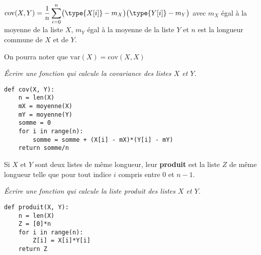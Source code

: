 $\displaystyle \text{cov}(X, Y) =  \frac 1n \sum_{i=0}^n \bigl(\type{X[i]} -m_X\bigr)\bigl(\type{Y[i]} -m_Y\bigr)$ avec $m_X$ égal à la moyenne de la liste $X$, $m_Y$ égal à la moyenne de la liste $Y$ et $n$ est la longueur commune de $X$ et de $Y$.

On pourra noter que $\text{var}(X) = \text{cov}(X, X)$
\begin{Exercise}[title = Covariance]
\it Écrire une fonction  qui calcule la covariance des listes $X$ et $Y$.
\end{Exercise}
\begin{Answer}
\begin{lstlisting}
def cov(X, Y):
    n = len(X)
    mX = moyenne(X)
    mY = moyenne(Y)
    somme = 0
    for i in range(n):
        somme = somme + (X[i] - mX)*(Y[i] - mY)
    return somme/n
\end{lstlisting}
\end{Answer}
\bigskip

Si $X$ et $Y$ sont deux listes de même longueur, leur {\bf produit} est la liste $Z$ de même longueur telle que  pour tout indice $i$ compris entre 0 et $n-1$.

\begin{Exercise}[title = Produit]
\it Écrire une fonction  qui calcule la liste produit des listes $X$ et $Y$.
\end{Exercise}
\begin{Answer}
\begin{lstlisting}
def produit(X, Y):
    n = len(X)
    Z = [0]*n
    for i in range(n):
        Z[i] = X[i]*Y[i]
    return Z
\end{lstlisting}
\end{Answer}
\bigskip

